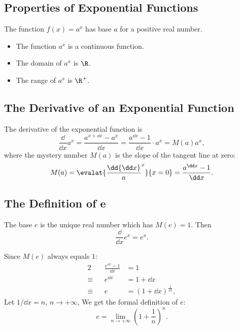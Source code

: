 \subsection{Properties of Exponential Functions}
The function $f(x)=a^x$ has base $a$ for a positive real number.
\begin{itemize}
\item The function $a^x$ is a continuous function.
\item The domain of $a^x$ is $\R$.
\item The range of $a^x$ is $\R^+$.
\end{itemize}

\subsection{The Derivative of an Exponential Function}
The derivative of the exponential function is
\[
\frac\dd{\dd x}a^x=\frac{a^{x+\dd x}-a^x}{\dd x}=\frac{a^{\dd x}-1}{\dd x}\cdot a^x=M(a)a^x,
\]
where the mystery number $M(a)$ is the slope of the tangent line at zero:
\[M(a)=\evalat{\frac\dd{\dd x}a^x}{x=0}=\frac{a^{\dd x}-1}{\dd x}.\]

\subsection{The Definition of $\bm e$}
The base $e$ is the unique real number which has $M(e)=1$. Then
\[\frac\dd{\dd x}e^x=e^x.\]

Since $M(e)$ always equals $1$:
\begin{alignat*}{2}
         && \frac{e^{\dd x} -1}{\dd x} & =1\\
  \equiv &&                  e^{\dd x} & =1+\dd x\\
  \equiv &&                          e & =(1+\dd x)^{\frac{1}{\dd x}},
\end{alignat*}
Let $1/\dd x=n$, $n\to+\infty$, We get the formal definition of $e$:
\[e=\lim_{n\to+\infty}(1+\frac{1}{n})^n.\]

